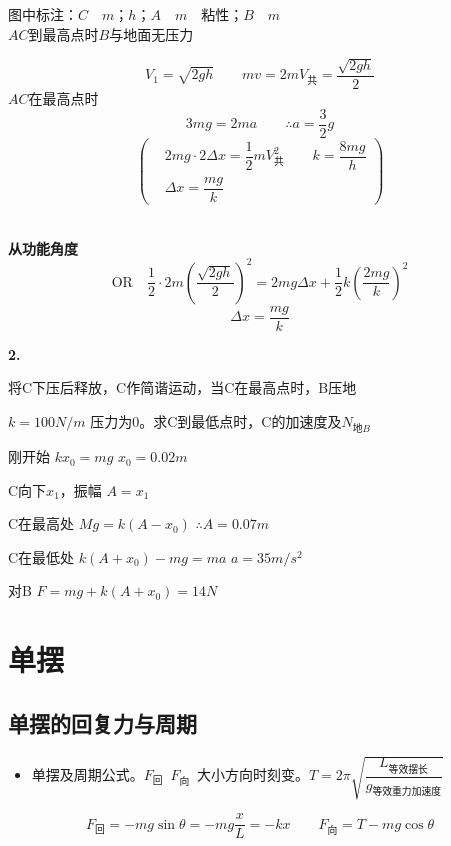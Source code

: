 \begin{problem}[⑤]
图中标注：$C$　$m$；$h$；$A$　$m$　粘性；$B$　$m$\\
$AC$到最高点时$B$与地面无压力
\begin{solution}
\[
V_1=\sqrt{2gh}\qquad mv=2mV_{\text{共}}=\dfrac{\sqrt{2gh}}{2}
\]%
$AC$在最高点时
\[
3mg=2ma\qquad\therefore a=\dfrac{3}{2}g
\]
\[
\left(\begin{aligned}
&2mg\cdot2\Delta x=\dfrac{1}{2}mV_{\text{共}}^2\qquad k=\dfrac{8mg}{h}\\
&\Delta x=\dfrac{mg}{k}
\end{aligned}\right)
\]%

\textbf{从功能角度}
\[
\text{OR}\quad\dfrac{1}{2}\cdot2m\left(\dfrac{\sqrt{2gh}}{2}\right)^2=2mg\Delta x+\dfrac{1}{2}k\left(\dfrac{2mg}{k}\right)^2
\]
\[
\Delta x=\dfrac{mg}{k}
\]
\end{solution}
\end{problem}

\textbf{2.}

\begin{problem}
将C下压后释放，C作简谐运动，当C在最高点时，B压地

$k=100\unit{N/m}$ \quad 压力为0。求C到最低点时，C的加速度及$N_{\text{地}B}$
\begin{solution}
刚开始 \quad $kx_0=mg$ \quad $x_0=0.02\unit{m}$

C向下$x_1$，振幅 $A=x_1$

C在最高处 \quad $Mg=k(A-x_0)$ \quad $\therefore A=0.07\unit{m}$

C在最低处 \quad $k(A+x_0)-mg=ma$ \quad $a=35\unit{m/s^2}$

对B \quad $F=mg+k(A+x_0)=14\unit{N}$ %
\end{solution}
\end{problem}


\section{单摆}
\subsection{单摆的回复力与周期}
\begin{itemize}
\item 单摆及周期公式。\quad $F_{\text{回}}$\ $F_{\text{向}}$\ 大小方向时刻变。\quad $T=2\pi\sqrt{\dfrac{L_{\text{等效摆长}}}{g_{\text{等效重力加速度}}}}$
\end{itemize}
\[ F_{\text{回}}=-mg\sin\theta=-mg\frac{x}{L}=-kx\qquad F_{\text{向}}=T-mg\cos\theta \]

